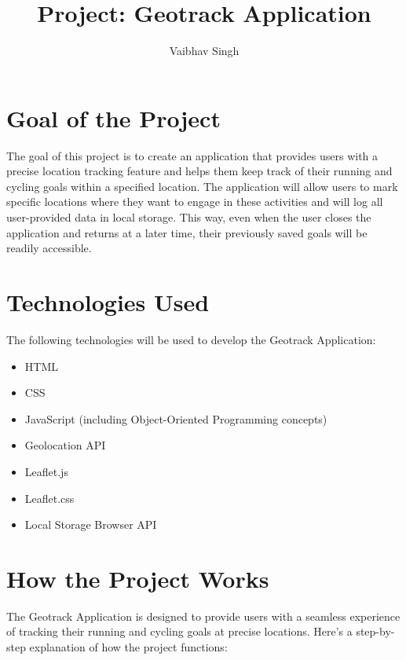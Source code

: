 \documentclass{article}
\title{Project: Geotrack Application}
\author{Vaibhav Singh}
\begin{document}
\maketitle

\section{Goal of the Project}

The goal of this project is to create an application that provides users with a precise location tracking feature and helps them keep track of their running and cycling goals within a specified location. The application will allow users to mark specific locations where they want to engage in these activities and will log all user-provided data in local storage. This way, even when the user closes the application and returns at a later time, their previously saved goals will be readily accessible.

\section{Technologies Used}

The following technologies will be used to develop the Geotrack Application:

\begin{itemize}
  \item HTML
  \item CSS
  \item JavaScript (including Object-Oriented Programming concepts)
  \item Geolocation API
  \item Leaflet.js
  \item Leaflet.css
  \item Local Storage Browser API
\end{itemize}

\section{How the Project Works}

The Geotrack Application is designed to provide users with a seamless experience of tracking their running and cycling goals at precise locations. Here's a step-by-step explanation of how the project functions:
\end{document}
